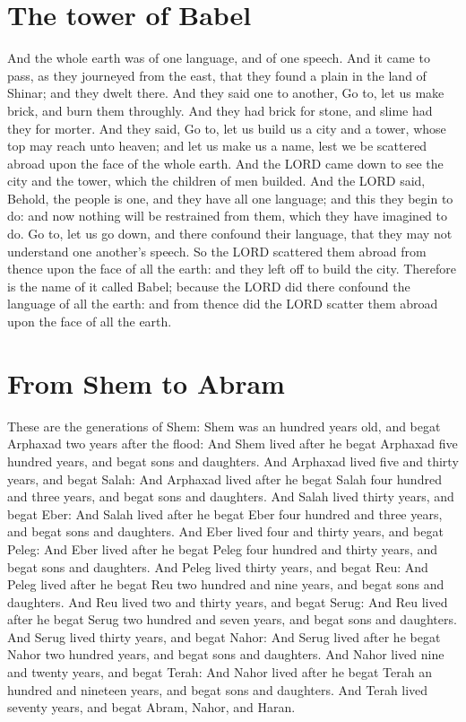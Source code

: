 \section*{The tower of Babel}
\begin{biblechapter} %
\verse And the whole earth was of one language, and of one speech.
\verse And it came to pass, as they journeyed from the east, that they found a plain in the land of Shinar; and they dwelt there.
\verse And they said one to another, Go to, let us make brick, and burn them throughly. And they had brick for stone, and slime had they for morter.
\verse And they said, Go to, let us build us a city and a tower, whose top may reach unto heaven; and let us make us a name, lest we be scattered abroad upon the face of the whole earth.
\verse And the LORD came down to see the city and the tower, which the children of men builded.
\verse And the LORD said, Behold, the people is one, and they have all one language; and this they begin to do: and now nothing will be restrained from them, which they have imagined to do.
\verse Go to, let us go down, and there confound their language, that they may not understand one another's speech.
\verse So the LORD scattered them abroad from thence upon the face of all the earth: and they left off to build the city.
\verse Therefore is the name of it called Babel; because the LORD did there confound the language of all the earth: and from thence did the LORD scatter them abroad upon the face of all the earth.
\section*{From Shem to Abram}
\verse These are the generations of Shem: Shem was an hundred years old, and begat Arphaxad two years after the flood:
\verse And Shem lived after he begat Arphaxad five hundred years, and begat sons and daughters.
\verse And Arphaxad lived five and thirty years, and begat Salah:
\verse And Arphaxad lived after he begat Salah four hundred and three years, and begat sons and daughters.
\verse And Salah lived thirty years, and begat Eber:
\verse And Salah lived after he begat Eber four hundred and three years, and begat sons and daughters.
\verse And Eber lived four and thirty years, and begat Peleg:
\verse And Eber lived after he begat Peleg four hundred and thirty years, and begat sons and daughters.
\verse And Peleg lived thirty years, and begat Reu:
\verse And Peleg lived after he begat Reu two hundred and nine years, and begat sons and daughters.
\verse And Reu lived two and thirty years, and begat Serug:
\verse And Reu lived after he begat Serug two hundred and seven years, and begat sons and daughters.
\verse And Serug lived thirty years, and begat Nahor:
\verse And Serug lived after he begat Nahor two hundred years, and begat sons and daughters.
\verse And Nahor lived nine and twenty years, and begat Terah:
\verse And Nahor lived after he begat Terah an hundred and nineteen years, and begat sons and daughters.
\verse And Terah lived seventy years, and begat Abram, Nahor, and Haran.

\end{biblechapter}
